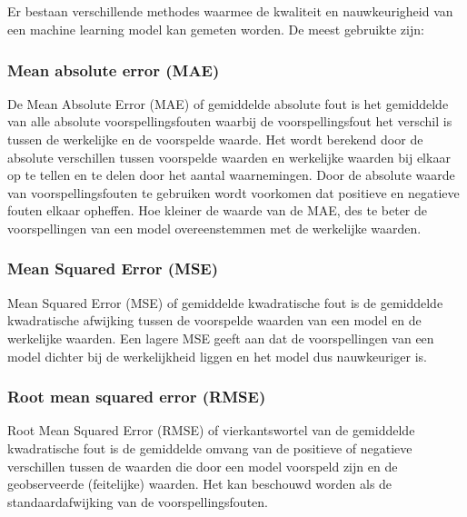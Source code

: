 \subsection{}%
\label{sec:Machine learning modellen evalueren}

Er bestaan verschillende methodes waarmee de kwaliteit en nauwkeurigheid van een machine learning model kan gemeten worden. De meest gebruikte zijn:

\subsubsection{Mean absolute error (MAE)}

De Mean Absolute Error (MAE) of gemiddelde absolute fout is het gemiddelde van alle absolute voorspellingsfouten waarbij de voorspellingsfout het verschil is tussen de werkelijke en de voorspelde waarde. Het wordt berekend door de absolute verschillen tussen voorspelde waarden en werkelijke waarden bij elkaar op te tellen en te delen door het aantal waarnemingen. Door de absolute waarde van voorspellingsfouten te gebruiken wordt voorkomen dat positieve en negatieve fouten elkaar opheffen. Hoe kleiner de waarde van de MAE, des te beter de voorspellingen van een model overeenstemmen met de werkelijke waarden.

\subsubsection{Mean Squared Error (MSE)}

Mean Squared Error (MSE) of gemiddelde kwadratische fout is de gemiddelde kwadratische afwijking tussen de voorspelde waarden van een model en de werkelijke waarden. Een lagere MSE geeft aan dat de voorspellingen van een model dichter bij de werkelijkheid liggen en het model dus nauwkeuriger is.

\subsubsection{Root mean squared error (RMSE)}

Root Mean Squared Error (RMSE) of vierkantswortel van de gemiddelde kwadratische fout is de gemiddelde omvang van de positieve of negatieve verschillen tussen de waarden die door een model voorspeld zijn en de geobserveerde (feitelijke) waarden. Het kan beschouwd worden als de standaardafwijking van de voorspellingsfouten. \\

